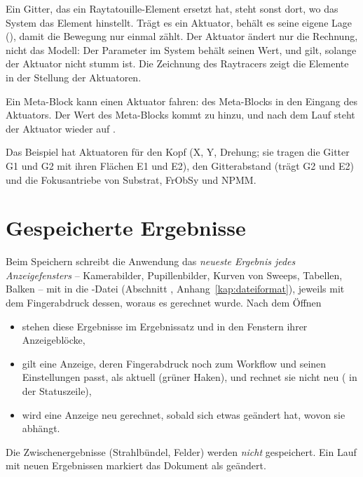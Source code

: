 Ein Gitter, das ein Raytatouille-Element ersetzt hat, steht sonst dort, wo das System das Element
hinstellt. Trägt es ein Aktuator, behält es seine eigene Lage (), damit die
Bewegung nur einmal zählt. Der Aktuator ändert nur die Rechnung, nicht das Modell: Der
Parameter im System behält seinen Wert, und  gilt, solange der Aktuator nicht stumm
ist. Die Zeichnung des Raytracers zeigt die Elemente in der Stellung der Aktuatoren.

Ein Meta-Block kann einen Aktuator fahren:  des Meta-Blocks in den Eingang
 des Aktuators. Der Wert des Meta-Blocks kommt zu  hinzu, und nach dem
Lauf steht der Aktuator wieder auf .

\begin{hinweis}
Das Beispiel  hat Aktuatoren für den Kopf (X, Y,
Drehung; sie tragen die Gitter G1 und G2 mit ihren Flächen E1 und E2), den Gitterabstand (trägt
G2 und E2) und die Fokusantriebe von Substrat, FrObSy und NPMM.
\end{hinweis}

\section{Gespeicherte Ergebnisse}\label{sec:workflow-gespeichert}

Beim Speichern schreibt die Anwendung das \emph{neueste Ergebnis jedes Anzeigefensters} –
Kamerabilder, Pupillenbilder, Kurven von Sweeps, Tabellen, Balken – mit in die
-Datei (Abschnitt , Anhang~\ref{kap:dateiformat}), jeweils mit dem
Fingerabdruck dessen, woraus es gerechnet wurde. Nach dem Öffnen

\begin{itemize}
  \item stehen diese Ergebnisse im Ergebnissatz  und in den Fenstern ihrer
        Anzeigeblöcke,
  \item gilt eine Anzeige, deren Fingerabdruck noch zum Workflow und seinen Einstellungen passt,
        als aktuell (grüner Haken), und  rechnet sie nicht neu
        ( in der Statuszeile),
  \item wird eine Anzeige neu gerechnet, sobald sich etwas geändert hat, wovon sie abhängt.
\end{itemize}

Die Zwischenergebnisse (Strahlbündel, Felder) werden \emph{nicht} gespeichert. Ein Lauf mit neuen
Ergebnissen markiert das Dokument als geändert.

